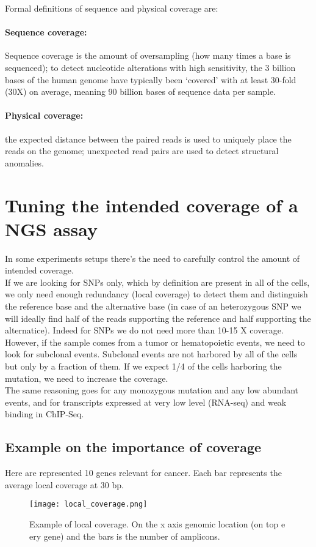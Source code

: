 Formal definitions of sequence and physical coverage are:

\paragraph*{Sequence coverage:}
	Sequence coverage is the amount of oversampling (how many times a base is sequenced); to detect nucleotide alterations with high sensitivity, the 3 billion bases of the human genome have typically been ‘covered’ with at least 30-fold (30X) on average, meaning 90 billion bases of sequence data per sample.
	\paragraph*{Physical coverage:}
		the expected distance between the paired reads is used to uniquely place the reads on the genome; unexpected read pairs are used to detect structural anomalies.



\section{Tuning the intended coverage of a NGS assay}
In some experiments setups there's the need to carefully control the amount of intended coverage. \\
If we are looking for SNPs only, which by definition are present in all of the cells, we only need enough redundancy (local coverage) to detect them and distinguish the reference base and the alternative base (in case of an heterozygous SNP we will ideally find half of the reads supporting the reference and half supporting the alternatice). Indeed for SNPs we do not need more than 10-15 X coverage.
\\
However, if the sample comes from a tumor or hematopoietic events, we need to look for subclonal events. Subclonal events are not harbored by all of the cells but only by a fraction of them. If we expect 1/4 of the cells harboring the mutation, we need to increase the coverage. \\
The same reasoning goes for any monozygous mutation and any low abundant events, and for  transcripts expressed at very low level (RNA-seq) and weak binding in ChIP-Seq.

\subsection{Example on the importance of coverage}
Here are represented 10 genes relevant for cancer. Each bar represents the average local coverage at 30 bp.
\begin{figure}[H]
    \centering
    \texttt{[image: local\_coverage.png]}
    \caption{Example of local coverage. On the x axis genomic location (on top e ery gene) and the bars is the number of amplicons. }
    \label{fig:local}
\end{figure}

